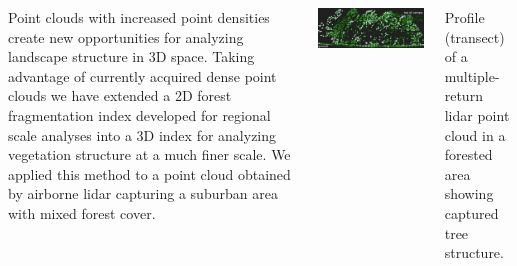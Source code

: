 \documentclass[25pt, margin=0mm, innermargin=15mm, blockverticalspace=15mm, colspace=15mm, subcolspace=8mm]{tikzposter}
\begin{document}
\begin{columns}
{Point clouds with increased point densities create new opportunities
for analyzing landscape structure in 3D space.
Taking advantage of currently acquired dense point clouds
we have extended a 2D forest fragmentation index developed for regional scale analyses \citep{riitters2000global}
into a 3D index for analyzing vegetation structure at a much finer scale.
We applied this method to a point cloud obtained by airborne lidar capturing
a suburban area with mixed forest cover.

\vspace{2ex}

\begin{center}
\includegraphics[width=\linewidth]{lidar_profile}
\end{center}

Profile (transect) of a multiple-return lidar point cloud in a forested area
showing captured tree structure.

\vspace{3ex}

}
\end{columns}
\end{document}
